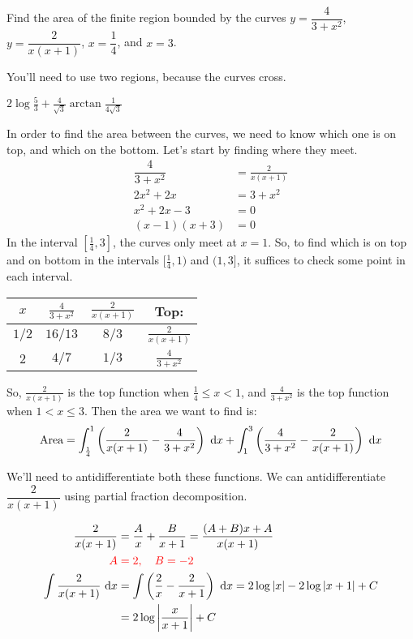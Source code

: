 \begin{question}
Find the area of the finite region bounded by the curves $y=\dfrac{4}{3+x^2}$, $y=\dfrac{2}{x(x+1)}$, $x=\dfrac14$, and $x=3$.
\end{question}
\begin{hint}
You'll need to use two regions, because the curves cross.
\end{hint}
\begin{answer}
$\displaystyle2\log\frac53+\frac{4}{\sqrt3}\arctan\frac{1}{4\sqrt3}$
\end{answer}
\begin{solution}
In order to find the area between the curves, we need to know which one is on top, and which on the bottom. Let's start by finding where they meet.
\begin{align*}
\dfrac{4}{3+x^2}&=\frac{2}{x(x+1)}\\
2x^2+2x&=3+x^2\\
x^2+2x-3&=0\\
(x-1)(x+3)&=0
\end{align*}
In the interval $[\frac14,3]$, the curves only meet at $x=1$. So, to find which is on top and on bottom in the intervals $[\frac14,1)$ and $(1,3]$, it suffices to check some point in each interval.
\begin{center}
\begin{tabular}{|c||c|c||c|}
\hline
$x$ & $\frac{4}{3+x^2}$ & $\frac{2}{x(x+1)}$& Top:\\
\hline
$1/2$ &$16/13$ &$8/3$ &$\frac{2}{x(x+1)}$\\
\hline
$2$ &$4/7$ & $1/3$& $\frac{4}{3+x^2}$\\
\hline
\end{tabular}
\end{center}
So, $\frac{2}{x(x+1)}$ is the top function when $\frac{1}{4}\leq x < 1$, and
$\frac{4}{3+x^2}$ is the top function when $1<x \leq 3$. Then the area we want to find is:
\[\mbox{Area}=\int_{\frac14}^1 \left( \frac{2}{x(x+1)} - \frac{4}{3+x^2}\right)~\mathrm{d}x+
\int_{1}^3 \left( \frac{4}{3+x^2} -\frac{2}{x(x+1)}  \right)~\mathrm{d}x \]

We'll need to antidifferentiate both these functions. We can antidifferentiate $\dfrac{2}{x(x+1)}$ using partial fraction decomposition.

\begin{align*}
\frac{2}{x(x+1)}&=\frac{A}{x}+\frac{B}{x+1} = \frac{(A+B)x+A}{x(x+1)}\\
\color{red}A&\color{red}=2,\quad B=-2\\
\int\frac{2}{x(x+1)}~\mathrm{d}x&=\int\left(\frac{2}{x}-\frac{2}{x+1}\right)~\mathrm{d}x=2\log|x|-2\log|x+1|+C\\
&=2\log\left| \frac{x}{x+1}\right|+C
\end{align*}


\end{solution}
